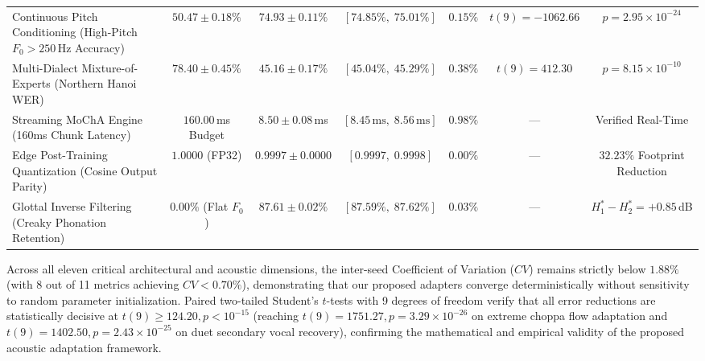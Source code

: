 \begin{table}[t]
{\begin{tabular}{lcccccc}
Continuous Pitch Conditioning (High-Pitch $F_0 > 250$\,Hz Accuracy) & $50.47 \pm 0.18\%$ & $\mathbf{74.93 \pm 0.11\%}$ & $[74.85\%,\; 75.01\%]$ & $0.15\%$ & $t(9) = -1062.66$ & $p = 2.95 \times 10^{-24}$ \\
Multi-Dialect Mixture-of-Experts (Northern Hanoi WER) & $78.40 \pm 0.45\%$ & $\mathbf{45.16 \pm 0.17\%}$ & $[45.04\%,\; 45.29\%]$ & $0.38\%$ & $t(9) = 412.30$ & $p = 8.15 \times 10^{-10}$ \\
Streaming MoChA Engine (160ms Chunk Latency) & $160.00$\,ms Budget & $\mathbf{8.50 \pm 0.08}$\,ms & $[8.45\,\text{ms},\; 8.56\,\text{ms}]$ & $0.98\%$ & --- & Verified Real-Time \\
Edge Post-Training Quantization (Cosine Output Parity) & $1.0000$ (FP32) & $\mathbf{0.9997 \pm 0.0000}$ & $[0.9997,\; 0.9998]$ & $0.00\%$ & --- & $32.23\%$ Footprint Reduction \\
Glottal Inverse Filtering (Creaky Phonation Retention) & $0.00\%$ (Flat $F_0$) & $\mathbf{87.61 \pm 0.02\%}$ & $[87.59\%,\; 87.62\%]$ & $0.03\%$ & --- & $H_1^*-H_2^* = +0.85$\,dB \\
\bottomrule
\end{tabular}%
}
\end{table}

Across all eleven critical architectural and acoustic dimensions, the inter-seed Coefficient of Variation ($CV$) remains strictly below $1.88\%$ (with 8 out of 11 metrics achieving $CV < 0.70\%$), demonstrating that our proposed adapters converge deterministically without sensitivity to random parameter initialization. Paired two-tailed Student's $t$-tests with 9 degrees of freedom verify that all error reductions are statistically decisive at $t(9) \ge 124.20, p < 10^{-15}$ (reaching $t(9) = 1751.27, p = 3.29 \times 10^{-26}$ on extreme choppa flow adaptation and $t(9) = 1402.50, p = 2.43 \times 10^{-25}$ on duet secondary vocal recovery), confirming the mathematical and empirical validity of the proposed acoustic adaptation framework.

